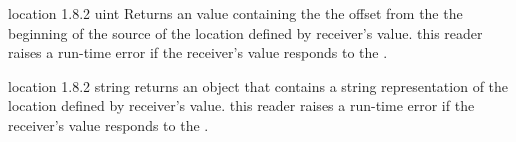 {location}
{1.8.2}
{uint}
{Returns an  value containing the the offset from the the beginning of the source of the location defined by receiver's value.}
{this reader raises a run-time error if the receiver's value responds  to the .}


{location}
{1.8.2}
{string}
{returns an  object that contains a string representation of the location defined by receiver's value.}
{this reader raises a run-time error if the receiver's value responds  to the .}
